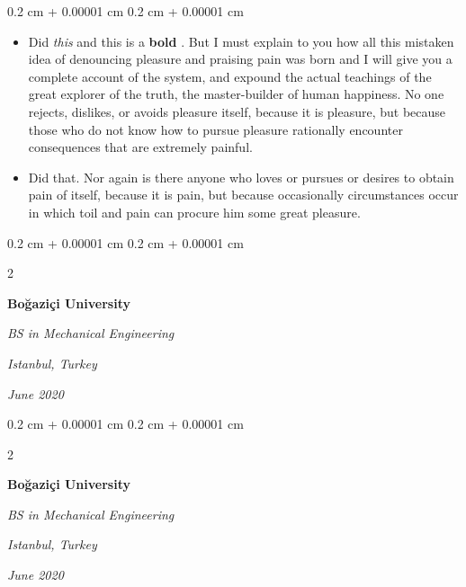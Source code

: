 \documentclass[10pt, letterpaper]{article}
\newenvironment{highlights}{
    \begin{itemize}[
        topsep=0.10 cm,
        parsep=0.10 cm,
        partopsep=0pt,
        itemsep=0pt,
        leftmargin=0.4 cm + 10pt
    ]
}{
    \end{itemize}
} %
\newenvironment{onecolentry}{
    \begin{adjustwidth}{
        0.2 cm + 0.00001 cm
    }{
        0.2 cm + 0.00001 cm
    }
}{
    \end{adjustwidth}
} %
\newenvironment{twocolentry}[2][]{
    \onecolentry
    \def\secondColumn{#2}
    \setcolumnwidth{\fill, 4.5 cm}
    \begin{paracol}{2}
}{
    \switchcolumn \raggedleft \secondColumn
    \end{paracol}
    \endonecolentry
} %
\let\hrefWithoutArrow\href
\renewcommand{\href}[2]{\hrefWithoutArrow{#1}{\ifthenelse{\equal{#2}{}}{ }{#2 }\raisebox{.15ex}{\footnotesize \faExternalLink*}}}
\begin{document}
        \vspace{0.10 cm}
        \begin{onecolentry}
            \begin{highlights}
                \item Did \textit{this} and this is a \textbf{bold} \href{https://example.com}{link}. But I must explain to you how all this mistaken idea of denouncing pleasure and praising pain was born and I will give you a complete account of the system, and expound the actual teachings of the great explorer of the truth, the master-builder of human happiness. No one rejects, dislikes, or avoids pleasure itself, because it is pleasure, but because those who do not know how to pursue pleasure rationally encounter consequences that are extremely painful.
                \item Did that. Nor again is there anyone who loves or pursues or desires to obtain pain of itself, because it is pain, but because occasionally circumstances occur in which toil and pain can procure him some great pleasure.
            \end{highlights}
        \end{onecolentry}


        \vspace{0.2 cm}

        \begin{twocolentry}{
        \textit{Istanbul, Turkey}    
            
        \textit{June 2020}}
            \textbf{Boğaziçi University}

            \textit{BS in Mechanical Engineering}
        \end{twocolentry}



        \vspace{0.2 cm}

        \begin{twocolentry}{
        \textit{Istanbul, Turkey}    
            
        \textit{June 2020}}
            \textbf{Boğaziçi University}

            \textit{BS in Mechanical Engineering}
        \end{twocolentry}
\end{document}
